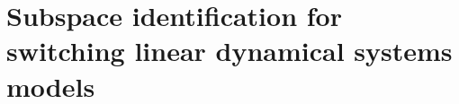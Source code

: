 \chapter{Subspace identification for switching linear dynamical systems models\label{ch:fastslds}}





